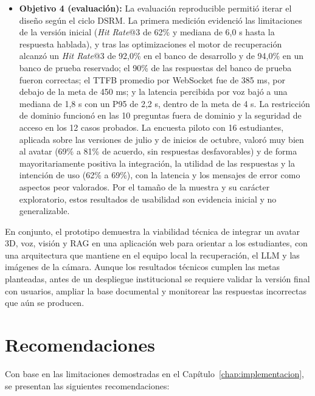 \begin{itemize}
    \item \textbf{Objetivo 4 (evaluación):} La evaluación reproducible permitió iterar el diseño según el ciclo DSRM. La primera medición evidenció las limitaciones de la versión inicial (\textit{Hit Rate}@3 de 62\% y mediana de 6,0 s hasta la respuesta hablada), y tras las optimizaciones el motor de recuperación alcanzó un \textit{Hit Rate}@3 de 92,0\% en el banco de desarrollo y de 94,0\% en un banco de prueba reservado; el 90\% de las respuestas del banco de prueba fueron correctas; el TTFB promedio por WebSocket fue de 385 ms, por debajo de la meta de 450 ms; y la latencia percibida por voz bajó a una mediana de 1,8 s con un P95 de 2,2 s, dentro de la meta de 4 s. La restricción de dominio funcionó en las 10 preguntas fuera de dominio y la seguridad de acceso en los 12 casos probados. La encuesta piloto con 16 estudiantes, aplicada sobre las versiones de julio y de inicios de octubre, valoró muy bien al avatar (69\% a 81\% de acuerdo, sin respuestas desfavorables) y de forma mayoritariamente positiva la integración, la utilidad de las respuestas y la intención de uso (62\% a 69\%), con la latencia y los mensajes de error como aspectos peor valorados. Por el tamaño de la muestra y su carácter exploratorio, estos resultados de usabilidad son evidencia inicial y no generalizable.
\end{itemize}

En conjunto, el prototipo demuestra la viabilidad técnica de integrar un avatar 3D, voz, visión y RAG en una aplicación web para orientar a los estudiantes, con una arquitectura que mantiene en el equipo local la recuperación, el LLM y las imágenes de la cámara. Aunque los resultados técnicos cumplen las metas planteadas, antes de un despliegue institucional se requiere validar la versión final con usuarios, ampliar la base documental y monitorear las respuestas incorrectas que aún se producen.

\section{Recomendaciones}
Con base en las limitaciones demostradas en el Capítulo~\ref{chap:implementacion}, se presentan las siguientes recomendaciones:

